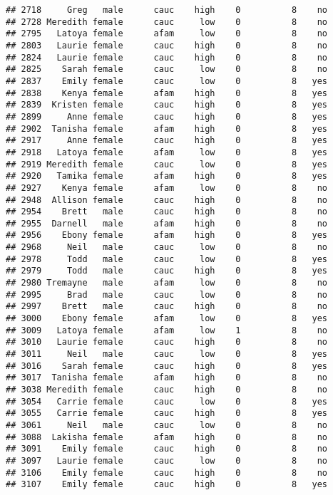 \documentclass[
]{article}
\begin{document}
\begin{verbatim}
## 2718     Greg   male      cauc    high    0          8    no
## 2728 Meredith female      cauc     low    0          8    no
## 2795   Latoya female      afam     low    0          8    no
## 2803   Laurie female      cauc    high    0          8    no
## 2824   Laurie female      cauc    high    0          8    no
## 2825    Sarah female      cauc     low    0          8    no
## 2837    Emily female      cauc     low    0          8   yes
## 2838    Kenya female      afam    high    0          8   yes
## 2839  Kristen female      cauc    high    0          8   yes
## 2899     Anne female      cauc    high    0          8   yes
## 2902  Tanisha female      afam    high    0          8   yes
## 2917     Anne female      cauc    high    0          8   yes
## 2918   Latoya female      afam     low    0          8   yes
## 2919 Meredith female      cauc     low    0          8   yes
## 2920   Tamika female      afam    high    0          8   yes
## 2927    Kenya female      afam     low    0          8    no
## 2948  Allison female      cauc    high    0          8    no
## 2954    Brett   male      cauc    high    0          8    no
## 2955  Darnell   male      afam    high    0          8    no
## 2956    Ebony female      afam    high    0          8   yes
## 2968     Neil   male      cauc     low    0          8    no
## 2978     Todd   male      cauc     low    0          8   yes
## 2979     Todd   male      cauc    high    0          8   yes
## 2980 Tremayne   male      afam     low    0          8    no
## 2995     Brad   male      cauc     low    0          8    no
## 2997    Brett   male      cauc    high    0          8    no
## 3000    Ebony female      afam     low    0          8   yes
## 3009   Latoya female      afam     low    1          8    no
## 3010   Laurie female      cauc    high    0          8    no
## 3011     Neil   male      cauc     low    0          8   yes
## 3016    Sarah female      cauc    high    0          8   yes
## 3017  Tanisha female      afam    high    0          8    no
## 3038 Meredith female      cauc    high    0          8    no
## 3054   Carrie female      cauc     low    0          8   yes
## 3055   Carrie female      cauc    high    0          8   yes
## 3061     Neil   male      cauc     low    0          8    no
## 3088  Lakisha female      afam    high    0          8    no
## 3091    Emily female      cauc    high    0          8    no
## 3097   Laurie female      cauc     low    0          8    no
## 3106    Emily female      cauc    high    0          8    no
## 3107    Emily female      cauc    high    0          8   yes

\end{verbatim}
\end{document}
